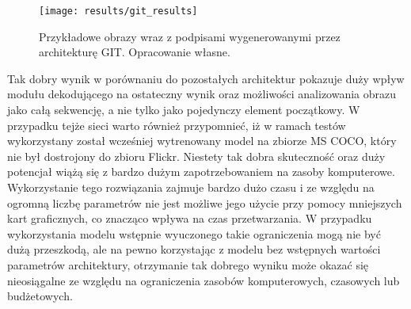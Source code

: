 \begin{figure}[H]
    \centering
    \texttt{[image: results/git\_results]}
    \caption{Przykładowe obrazy wraz z podpisami wygenerowanymi przez architekturę GIT. Opracowanie własne.}
    \label{fig:results-git}
\end{figure}
\noindent Tak dobry wynik w porównaniu do pozostałych architektur pokazuje duży wpływ modułu dekodującego na ostateczny wynik oraz możliwości analizowania obrazu jako całą sekwencję, a nie tylko jako pojedynczy element początkowy. W przypadku tejże sieci warto również przypomnieć, iż w ramach testów wykorzystany został wcześniej wytrenowany model na zbiorze MS COCO, który nie był dostrojony do zbioru Flickr. Niestety tak dobra skuteczność oraz duży potencjał wiążą się z bardzo dużym zapotrzebowaniem na zasoby komputerowe. Wykorzystanie tego rozwiązania zajmuje bardzo dużo czasu i ze względu na ogromną liczbę parametrów nie jest możliwe jego użycie przy pomocy mniejszych kart graficznych, co znacząco wpływa na czas przetwarzania. W przypadku wykorzystania modelu wstępnie wyuczonego takie ograniczenia mogą nie być dużą przeszkodą, ale na pewno korzystając z modelu bez wstępnych wartości parametrów architektury, otrzymanie tak dobrego wyniku może okazać się nieosiągalne ze względu na ograniczenia zasobów komputerowych, czasowych lub budżetowych.

